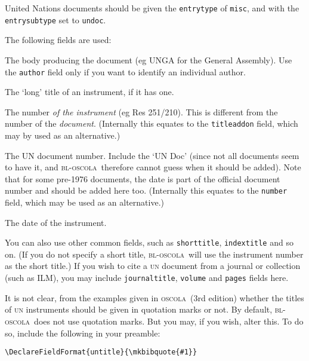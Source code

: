 \documentclass[a4paper,
               11pt,
	       DIV=1,			   
	       footinclude=false]
	      {scrartcl}
\newcommand{\oscola}{\textsc{bl-oscola}}
\newcommand{\oscolashort}{\textsc{oscola}\nocite{oscola}}
\begin{document}
United Nations documents should be given the \texttt{entrytype} of \texttt{misc}, and with the \texttt{entrysubtype} set to \texttt{undoc}.

The following fields are used:

\begin{description}
\item[institution] The body producing the document (eg UNGA for the General Assembly). Use the \texttt{author} field only if you want to identify an individual author.
\item[title] The `long' title of an instrument, if it has one.
\item[instrument\_no] The number \emph{of the instrument} (eg Res 251/210). This is different from the
number of the \emph{document}. (Internally this equates to the \texttt{titleaddon} field, which may
by used as an alternative.)
\item[doc\_no] The UN document number. Include the `UN Doc' (since not all documents seem to have it, and \oscola\ therefore
cannot guess when it should be added). Note that for some pre-1976 documents, the date is part of the official document number
and should be added here too. (Internally this equates to the \texttt{number} field, which may be used as an alternative.)
\item[date] The date of the instrument.
\end{description}

You can also use other common fields, such as \texttt{shorttitle}, \texttt{indextitle} and so on. (If you do not
specify a short title, \oscola\ will use the instrument number as the short title.) If you wish to cite a \textsc{un} document 
from a journal or collection (such as ILM), you may include \texttt{journaltitle}, \texttt{volume} and \texttt{pages} fields here.

It is not clear, from the examples given in \oscolashort\ (3rd edition) whether the 
titles of \textsc{un} instruments should be given in quotation marks or not.
By default, \oscola\ does not use quotation marks. But you may, if you wish, alter this. To do so,
include the following in your preamble:
\begin{verbatim}
\DeclareFieldFormat{untitle}{\mkbibquote{#1}}
\end{verbatim}
\end{document}
